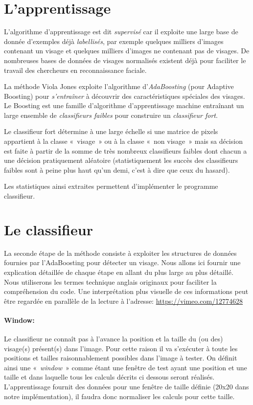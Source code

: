 \documentclass[a4paper,11pt]{report}
\begin{document}
\section{L’apprentissage}


	L’algorithme d’apprentissage est dit \textit{supervisé} car il exploite une large base de donnée d’exemples déjà \textit{labellisés}, par exemple quelques milliers d’images contenant un visage et quelques milliers d’images ne contenant pas de visages. De nombreuses bases de données de visages normalisés existent déjà pour faciliter le travail des chercheurs en reconnaissance faciale.

	La méthode Viola Jones exploite l’algorithme d’\textit{AdaBoosting} (pour Adaptive Boosting) pour \textit{s’entraîner} à découvrir des caractéristiques spéciales des visages. Le Boosting est une famille d’algorithme d’apprentissage machine entraînant un large ensemble de \textit{classifieurs faibles} pour construire un \textit{classifieur fort}.

	Le classifieur fort détermine à une large échelle si une matrice de pixels appartient à la classe « visage » ou à la classe « non visage » mais sa décision est faite à partir de la somme de très nombreux classifieurs faibles dont chacun a une décision pratiquement aléatoire (statistiquement les succès des classifieurs faibles sont à peine plus haut qu’un demi, c’est à dire que ceux du hasard).

	Les statistiques ainsi extraites permettent d’implémenter le programme classifieur.


\section{Le classifieur}


	La seconde étape de la méthode consiste à exploiter les structures de données fournies par l’AdaBoosting pour détecter un visage. Nous allons ici fournir une explication détaillée de chaque étape en allant du plus large au plus détaillé. Nous utiliserons les termes technique anglais originaux pour faciliter la compréhension du code.
	Une interprétation plus visuelle de ces informations peut être regardée en parallèle de la lecture à l’adresse: \href{https://vimeo.com/12774628}{https://vimeo.com/12774628}


\paragraph{Window:}
	Le classifieur ne connaît pas à l’avance la position et la taille du (ou des) visage(s) présent(s) dans l’image. Pour cette raison il va s’exécuter à toute les positions et tailles raisonnablement possibles dans l’image à tester. On définit ainsi une « \textit{window} » comme étant une fenêtre de test ayant une position et une taille et dans laquelle tous les calculs décrits ci dessous seront réalisés. L’apprentissage fournit des données pour une fenêtre de taille définie (20x20 dans notre implémentation),  il faudra donc normaliser les calculs pour cette taille.
\end{document}
